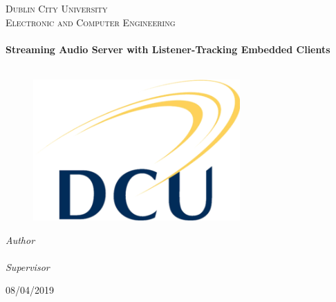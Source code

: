 \begin{titlepage}
  \begin{center}

    \textsc{\LARGE Dublin City University}\\[1.5cm]
    \textsc{\Large Electronic and Computer Engineering}\\[0.5cm]

    \HRule\\[0.4cm]
    {\huge \bfseries Streaming Audio Server with Listener-Tracking Embedded Clients\\[0.4cm]}
    \HRule\\[1.5cm]

    \begin{figure}[H]
	\includegraphics{images/Dcu-logo.png}
	\centering
    \end{figure}

    \vskip 3cm
    \emph{Author}\\[0.1cm]
    \noindent{}\\[0.1cm]

    \vskip 5mm
    \emph{Supervisor}
    \noindent{}\\[1cm]

    \vfill

      {\large{08/04/2019}}

  \end{center}
\end{titlepage}
